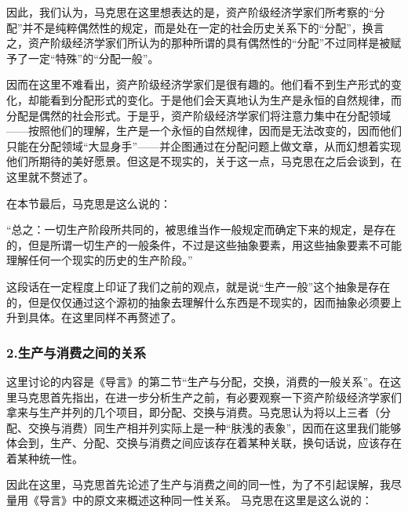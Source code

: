 \documentclass[a4paper,twoside,12pt,AutoFakeBold]{ctexart}
\begin{document}
因此，我们认为，马克思在这里想表达的是，资产阶级经济学家们所考察的“分配”并不是纯粹偶然性的规定，而是处在一定的社会历史关系下的“分配”，换言之，资产阶级经济学家们所认为的那种所谓的具有偶然性的“分配”不过同样是被赋予了一定“特殊”的“分配一般”。

因而在这里不难看出，资产阶级经济学家们是很有趣的。他们看不到生产形式的变化，却能看到分配形式的变化。于是他们会天真地认为生产是永恒的自然规律，而分配是偶然的社会形式。于是乎，资产阶级经济学家们将注意力集中在分配领域——按照他们的理解，生产是一个永恒的自然规律，因而是无法改变的，因而他们只能在分配领域“大显身手”——并企图通过在分配问题上做文章，从而幻想着实现他们所期待的美好愿景。但这是不现实的，关于这一点，马克思在之后会谈到，在这里就不赘述了。

在本节最后，马克思是这么说的：

\begin{adjustwidth}{2em}{2em}
    \qquad\fangsong
    “总之：一切生产阶段所共同的，被思维当作一般规定而确定下来的规定，是存在的，但是所谓一切生产的一般条件，不过是这些抽象要素，用这些抽象要素不可能理解任何一个现实的历史的生产阶段。”
\end{adjustwidth}
这段话在一定程度上印证了我们之前的观点，就是说“生产一般”这个抽象是存在的，但是仅仅通过这个源初的抽象去理解什么东西是不现实的，因而抽象必须要上升到具体。在这里同样不再赘述了。

\subsubsection{2.生产与消费之间的关系}

这里讨论的内容是《导言》的第二节“生产与分配，交换，消费的一般关系”。在这里马克思首先指出，在进一步分析生产之前，有必要观察一下资产阶级经济学家们拿来与生产并列的几个项目，即分配、交换与消费。马克思认为将以上三者（分配、交换与消费）同生产相并列实际上是一种“肤浅的表象”，因而在这里我们能够体会到，生产、分配、交换与消费之间应该存在着某种关联，换句话说，应该存在着某种统一性。

因此在这里，马克思首先论述了生产与消费之间的同一性，为了不引起误解，我尽量用《导言》中的原文来概述这种同一性关系。
马克思在这里是这么说的：
\end{document}
